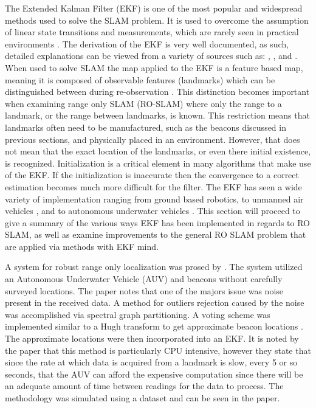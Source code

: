 \documentclass[conference]{IEEEtran}
\begin{document}
	The Extended Kalman Filter (EKF) is one of the most popular and widespread methods used to solve the SLAM problem. It is used to overcome the assumption of linear state transitions and measurements, which are rarely seen in practical environments \cite{Thrun2002}. The derivation of the EKF is very well documented, as such, detailed explanations can be viewed from a variety of sources such as: \cite{Thrun2002}, \cite{Ribeiro2004}, and \cite{Haykin2001}. When used to solve SLAM the map applied to the EKF is a feature based map, meaning it is composed of observable features (landmarks) which can be distinguished between during re-observation \cite{Thrun2002}. This distinction becomes important when examining range only SLAM (RO-SLAM) where only the range to a landmark, or the range between landmarks, is known. This restriction means that landmarks often need to be manufactured, such as the beacons discussed in previous sections, and physically placed in an environment. However, that does not mean that the exact location of the landmarks, or even there initial existence, is recognized. Initialization is a critical element in many algorithms that make use of the EKF. If the initialization is inaccurate then the convergence to a correct estimation becomes much more difficult for the filter. The EKF has seen a wide variety of implementation ranging from ground based robotics\cite{Djugash2008}, to unmanned air vehicles \cite{Fabresse2016}, and to autonomous underwater vehicles \cite{Olson2006}. This section will proceed to give a summary of the various ways EKF has been implemented in regards to RO SLAM, as well as examine improvements to the general RO SLAM problem that are applied via methods with EKF mind.
	
	
	
	A system for robust range only localization was prosed by \cite{Olson2006}. The system utilized an Autonomous Underwater Vehicle (AUV) and beacons without carefully surveyed locations. The paper notes that one of the majors issue was noise present in the received data. A method for outliers rejection caused by the noise was accomplished via spectral graph partitioning. A voting scheme was implemented similar to a Hugh transform to get approximate beacon locations \cite{Hough1959}. The approximate locations were then incorporated into an EKF. It is noted by the paper that this method is particularly CPU intensive, however they state that since the rate at which data is acquired from a landmark is slow, every 5 or so seconds, that the AUV can afford the expensive computation since there will be an adequate amount of time between readings for the data to process. The methodology was simulated using a dataset and can be seen in the paper.
	
\end{document}
